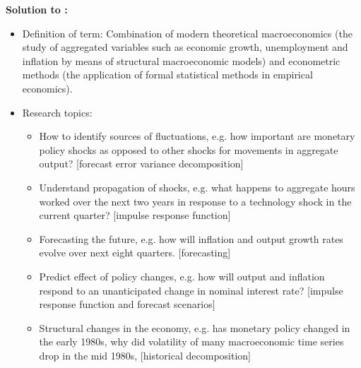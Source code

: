\documentclass[a4paper]{scrartcl}
\begin{document}
\begin{solution}\textbf{Solution to :}
\begin{itemize}
\item Definition of term: Combination of modern theoretical macroeconomics (the study of aggregated variables such as economic growth, unemployment and inflation by means of structural macroeconomic models) and econometric methods (the application of formal statistical methods in empirical economics).
\item Research topics:
\begin{itemize}
	\item How to identify sources of fluctuations, e.g. how important are monetary policy shocks as opposed to other shocks for movements in aggregate output? [forecast error variance decomposition]
	\item Understand propagation of shocks, e.g. what happens to aggregate hours worked over the next two years in response to a technology shock in the current quarter? [impulse response function]
	\item Forecasting the future, e.g. how will inflation and output growth rates evolve over next eight quarters. [forecasting]
	\item Predict effect of policy changes, e.g. how will output and inflation respond to an unanticipated change in nominal interest rate? [impulse response function and forecast scenarios]
	\item Structural changes in the economy, e.g. has monetary policy changed in the early 1980s, why did volatility of many macroeconomic time series drop in the mid 1980s, [historical decomposition]


\end{itemize}
\end{itemize}
\end{solution}
\end{document}
